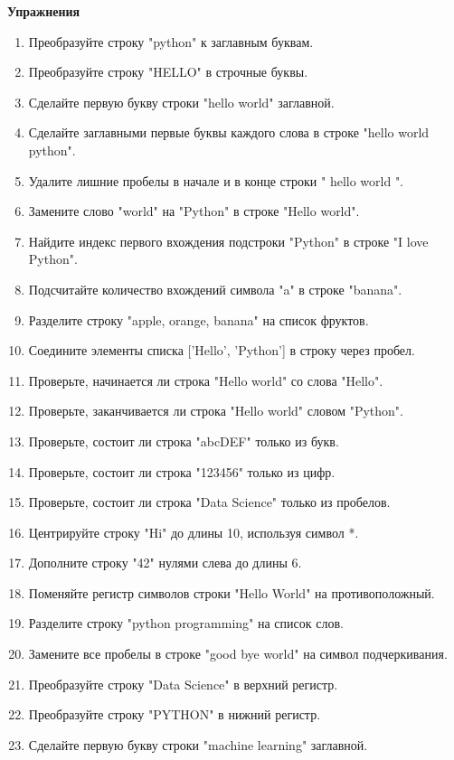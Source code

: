 \documentclass[a4,12pt]{article}
\theoremstyle{remark}
\begin{document}
\textbf{Упражнения}
\begin{enumerate}
    \item Преобразуйте строку "python" к заглавным буквам.
    \item Преобразуйте строку "HELLO" в строчные буквы.
    \item Сделайте первую букву строки "hello world" заглавной.
    \item Сделайте заглавными первые буквы каждого слова в строке "hello world python".
    \item Удалите лишние пробелы в начале и в конце строки " hello world ".
    \item Замените слово "world" на "Python" в строке "Hello world".
    \item Найдите индекс первого вхождения подстроки "Python" в строке "I love Python".
    \item Подсчитайте количество вхождений символа "a" в строке "banana".
    \item Разделите строку "apple, orange, banana" на список фруктов.
    \item Соедините элементы списка ['Hello', 'Python'] в строку через пробел.
    \item Проверьте, начинается ли строка "Hello world" со слова "Hello".
    \item Проверьте, заканчивается ли строка "Hello world" словом "Python".
    \item Проверьте, состоит ли строка "abcDEF" только из букв.
    \item Проверьте, состоит ли строка "123456" только из цифр.
    \item Проверьте, состоит ли строка "Data Science" только из пробелов.
    \item Центрируйте строку "Hi" до длины 10, используя символ *.
    \item Дополните строку "42" нулями слева до длины 6.
    \item Поменяйте регистр символов строки "Hello World" на противоположный.
    \item Разделите строку "python programming" на список слов.
    \item Замените все пробелы в строке "good bye world" на символ подчеркивания.
    \item Преобразуйте строку "Data Science" в верхний регистр.
    \item Преобразуйте строку "PYTHON" в нижний регистр.
    \item Сделайте первую букву строки "machine learning" заглавной.

\end{enumerate}
\end{document}
